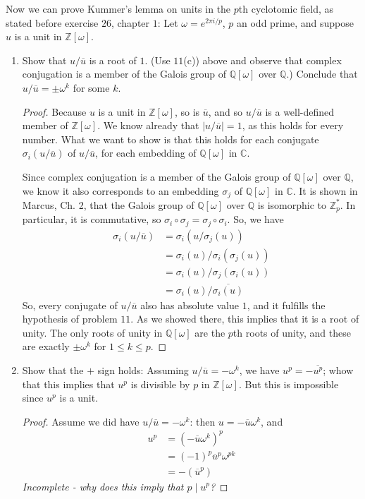 \documentclass[12pt]{article}
\newcommand{\Q}{\mathbb{Q}}
\newcommand{\Z}{\mathbb{Z}}
\newcommand{\C}{\mathbb{C}}
\theoremstyle{definition}
\newenvironment{problem}[2][Problem]{\begin{trivlist}
\item[\hskip \labelsep {\bfseries #1}\hskip \labelsep {\bfseries #2.}]}{\end{trivlist}}
\begin{document}
\begin{problem}{12}
	Now we can prove Kummer's lemma on units in the $p$th cyclotomic field, as stated before exercise $26$, chapter $1$: Let $\omega = e^{2\pi i / p}$, $p$ an odd prime, and suppose $u$ is a unit in $\Z[\omega]$.
	\begin{enumerate}[label=(\alph*)]
		\item Show that $u / \overline u$ is a root of $1$. (Use $11$(c)) above and observe that complex conjugation is a member of the Galois group of $\Q[\omega]$ over $\Q$.) Conclude that $u / \overline u = \pm \omega^k$  for some $k$.
		\begin{proof}
			\par Because $u$ is a unit in $\Z[\omega]$, so is $\overline u$, and so $u / \overline u$ is a well-defined member of $\Z[\omega]$. We know already that $\left \lvert { u / \overline u } \right \lvert  = 1$, as this holds for every number. What we want to show is that this holds for each conjugate $\sigma_i(u / \overline u)$ of $u / \overline u$, for each embedding of $\Q[\omega]$ in $\C$. 
			\par Since complex conjugation is a member of the Galois group of $\Q[\omega]$ over $\Q$, we know it also corresponds to an embedding $\sigma_j$ of $\Q[\omega]$ in $\C$. It is shown in Marcus, Ch. 2, that the Galois group of $\Q[\omega]$ over $\Q$ is isomorphic to $\Z_p^*$. In particular, it is commutative, so $\sigma_i \circ \sigma_j = \sigma_j \circ \sigma_i$. So, we have
			\begin{align*}
				\sigma_i(u / \overline u) &= \sigma_i (u / \sigma_j(u))\\
				&= \sigma_i(u) / \sigma_i(\sigma_j(u))\\
				&= \sigma_i(u) / \sigma_j(\sigma_i(u))\\
				&= \sigma_i(u)/\overline{\sigma_i(u)}
		\end{align*}
		So, every conjugate of $u / \overline u$ also has absolute value $1$, and it fulfills the hypothesis of problem $11$. As we showed there, this implies that it is a root of unity. The only roots of unity in $\Q[\omega]$ are the $p$th roots of unity, and these are exactly $\pm \omega^k$ for $1 \leq k \leq p$.
		\end{proof}
	\item Show that the $+$ sign holds: Assuming $u / \overline u = -\omega^k$, we have $u^p = - \overline{u^p}$; whow that this implies that $u^p$ is divisible by $p$ in $\Z[\omega]$. But this is impossible since $u^p$ is a unit.
		\begin{proof}
			Assume we did have $u / \overline u = - \omega^k$: then $u = -\overline u \omega^k$, and
			\begin{align*}
				u^p &= (- \overline u \omega^k)^p\\
			&= (-1)^p {\overline u}^p \omega^{pk}\\
			&= -({\overline u}^p)
			\end{align*}
			\textit{Incomplete - why does this imply that $p \mid u^p$?}
		\end{proof}
	\end{enumerate}
\end{problem}
\end{document}
